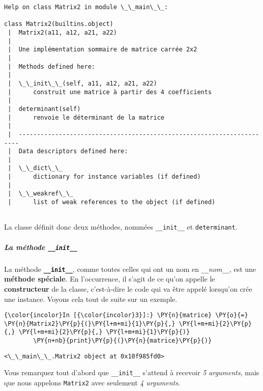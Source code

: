     \begin{Verbatim}[commandchars=\\\{\}]
Help on class Matrix2 in module \_\_main\_\_:

class Matrix2(builtins.object)
 |  Matrix2(a11, a12, a21, a22)
 |  
 |  Une implémentation sommaire de matrice carrée 2x2
 |  
 |  Methods defined here:
 |  
 |  \_\_init\_\_(self, a11, a12, a21, a22)
 |      construit une matrice à partir des 4 coefficients
 |  
 |  determinant(self)
 |      renvoie le déterminant de la matrice
 |  
 |  ----------------------------------------------------------------------
 |  Data descriptors defined here:
 |  
 |  \_\_dict\_\_
 |      dictionary for instance variables (if defined)
 |  
 |  \_\_weakref\_\_
 |      list of weak references to the object (if defined)


    \end{Verbatim}

    La classe définit donc deux méthodes, nommées \texttt{\_\_init\_\_} et
\texttt{determinant}.

    \hypertarget{la-muxe9thode-__init__}{%
\subparagraph{\texorpdfstring{La méthode
\texttt{\_\_init\_\_}}{La méthode \_\_init\_\_}}\label{la-muxe9thode-__init__}}

    La méthode \textbf{\texttt{\_\_init\_\_}}, comme toutes celles qui ont
un nom en \texttt{\_\_}\emph{nom}\texttt{\_\_}, est une \textbf{méthode
spéciale}. En l'occurrence, il s'agit de ce qu'on appelle le
\textbf{constructeur} de la classe, c'est-à-dire le code qui va être
appelé lorsqu'on crée une instance. Voyons cela tout de suite sur un
exemple.

    \begin{Verbatim}[commandchars=\\\{\}]
{\color{incolor}In [{\color{incolor}3}]:} \PY{n}{matrice} \PY{o}{=} \PY{n}{Matrix2}\PY{p}{(}\PY{l+m+mi}{1}\PY{p}{,} \PY{l+m+mi}{2}\PY{p}{,} \PY{l+m+mi}{2}\PY{p}{,} \PY{l+m+mi}{1}\PY{p}{)}
        \PY{n+nb}{print}\PY{p}{(}\PY{n}{matrice}\PY{p}{)}
\end{Verbatim}


    \begin{Verbatim}[commandchars=\\\{\}]
<\_\_main\_\_.Matrix2 object at 0x10f985fd0>

    \end{Verbatim}

    Vous remarquez tout d'abord que \texttt{\_\_init\_\_} s'attend à
recevoir \emph{5 arguments}, mais que nous appelons \texttt{Matrix2}
avec seulement \emph{4 arguments}.

